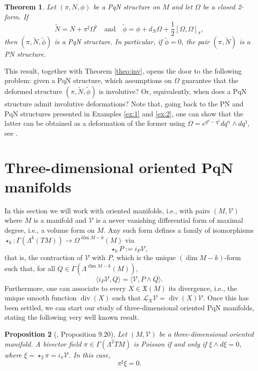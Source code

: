 \documentclass[12pt]{article}
\newtheorem{theorem}{Theorem}%
\newtheorem{prop}[theorem]{Proposition}
\begin{document}
\begin{theorem}\label{thm:defthe} Let $(\pi,N,\phi)$ be a PqN structure on $M$ and let $\Omega$ be a closed 2-form. If 
\[
\widetilde N=N+\pi^\sharp\Omega^\flat\quad\text{and}\quad\widetilde\phi=\phi+d_N\Omega+
\frac{1}{2}[\Omega,\Omega]_{\pi},
\]
then $(\pi,\widetilde N,\widetilde\phi)$ is a PqN structure. In particular, if $\widetilde\phi=0$, 
the pair $(\pi,\widetilde N)$ is a PN structure.
\end{theorem} 
This result, together with Theorem \ref{theo:inv}, opens the door to the following problem: given a PqN structure, 
which assumptions on $\Omega$ guarantee that the deformed structure $(\pi,\widetilde N,\widetilde\phi)$ is involutive? Or, equivalently, when does a PqN structure admit involutive deformations? Note that, going back to the PN and PqN structures presented in Examples \ref{ex:1} and \ref{ex:2}, one can show that the latter can be obtained as a deformation of the former using $\Omega=e^{q^n-q^1}dq^n\wedge dq^1$, see \cite{FMOP2020,FMP2023,FMP2024}.

\section{Three-dimensional oriented PqN manifolds}\label{sec:3} 

In this section we will work with oriented manifolds, i.e., with pairs $(M,\mathcal V)$ where $M$ is a manifold and $\mathcal V$ is a never vanishing differential form of maximal degree, i.e., a volume form on $M$. Any such form defines a family of isomorphisms $\star_k:\Gamma(\Lambda^k(TM))\rightarrow\Omega^{\dim M-k}(M)$ via 
\[
\star_kP:=i_P\mathcal V,
\] 
that is, the contraction of $\mathcal V$ with $P$, which is the unique $(\dim M-k)$-form such that, for all 
$Q\in\Gamma(\Lambda^{\dim M-k}(M))$,
\[
\langle i_P\mathcal V,Q\rangle=\langle\mathcal V,P\wedge Q\rangle.
\] 
Furthermore, one can associate to every $X\in\mathfrak X(M)$  its divergence, i.e., the unique smooth function $\operatorname{div}(X)$ such that $\mathcal L_X\mathcal V=\operatorname{div}(X)\mathcal V$. Once this has been settled, we can start our study of  
three-dimensional oriented PqN manifolds, stating the following very well known result.

\begin{prop}[\cite{L-GPV}, Proposition 9.20]
\label{prop:xi1} 
Let $(M,\mathcal V)$ be a three-dimensional oriented manifold. 
A bivector field $\pi\in\Gamma(\Lambda^2TM)$ is Poisson if and only if $\xi\wedge d\xi=0$, 
where $\xi=\star_2\pi=i_\pi\mathcal V$.
In this case, 
\begin{equation}
\label{prop:xi2}
\pi^\sharp\xi=0.
\end{equation}
\end{prop}
\end{document}
